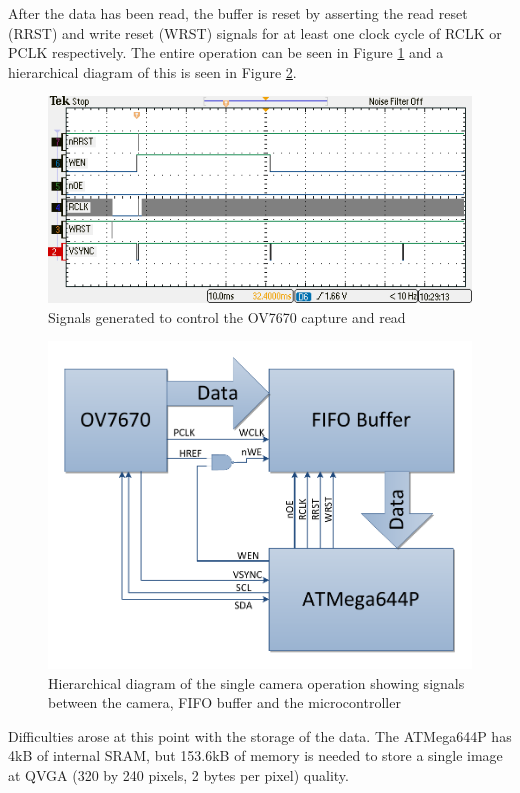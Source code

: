 After the data has been read, the buffer is reset by asserting the read reset (RRST) and write reset (WRST) signals for at least one clock cycle of RCLK or PCLK respectively. The entire operation can be seen in Figure \ref{fig:ov_Capture} and a hierarchical diagram of this is seen in Figure \ref{fig:cam:heir}.
\begin{figure}
\includegraphics[width = \textwidth]{./Figures/ov7670_im_capture.png}
\caption{Signals generated to control the OV7670 capture and read}
\label{fig:ov_Capture}
\end{figure}
\begin{figure}
\includegraphics[width=\textwidth]{./Figures/Camera_Hierarchy.pdf}
\caption{Hierarchical diagram of the single camera operation showing signals between the camera, FIFO buffer and the microcontroller}
\label{fig:cam:heir}
\end{figure}

Difficulties arose at this point with the storage of the data. The ATMega644P has 4kB of internal SRAM, but  153.6kB of memory is needed to store a single image at QVGA (320 by 240 pixels, 2 bytes per pixel) quality. 

